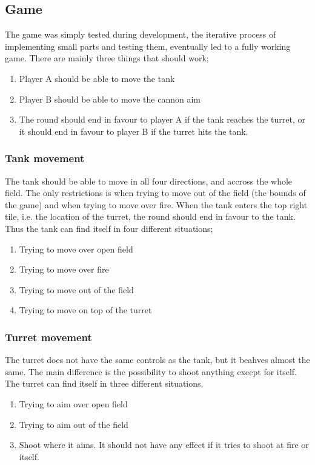 \subsection{Game}
The game was simply tested during development, the iterative process of implementing
small parts and testing them, eventually led to a fully working game. There are 
mainly three things that should work;
\begin{enumerate}
  \item Player A should be able to move the tank
  \item Player B should be able to move the cannon aim
  \item The round should end in favour to player A if the tank reaches the turret, or it
  	should end in favour to player B if the turret hits the tank.
\end{enumerate}

\subsubsection{Tank movement}
The tank should be able to move in all four directions, and accross the whole field. The only 
restrictions is when trying to move out of the field (the bounds of the game) and when
trying to move over fire. When the tank enters the top right tile, i.e. the location of the 
turret, the round should end in favour to the tank. Thus the tank can find itself in four
different situations;
\begin{enumerate}
  \item Trying to move over open field
  \item Trying to move over fire
  \item Trying to move out of the field
  \item Trying to move on top of the turret
\end{enumerate}

\subsubsection{Turret movement}
The turret does not have the same controls as the tank, but it beahves almost the same. 
The main difference is the possibility to shoot anything execpt for itself. 
The turret can find itself in three different situations.
\begin{enumerate}
  \item Trying to aim over open field
  \item Trying to aim out of the field
  \item Shoot where it aims. It should not have any effect if it tries to shoot at fire
  or itself.
\end{enumerate}

